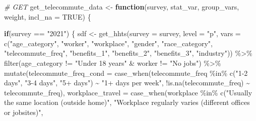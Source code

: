 \documentclass[
  12pt,
]{article}
\newenvironment{Shaded}{\begin{snugshade}}{\end{snugshade}}
\newcommand{\AttributeTok}[1]{\textcolor[rgb]{0.77,0.63,0.00}{#1}}
\newcommand{\CommentTok}[1]{\textcolor[rgb]{0.56,0.35,0.01}{\textit{#1}}}
\newcommand{\ConstantTok}[1]{\textcolor[rgb]{0.00,0.00,0.00}{#1}}
\newcommand{\ControlFlowTok}[1]{\textcolor[rgb]{0.13,0.29,0.53}{\textbf{#1}}}
\newcommand{\FunctionTok}[1]{\textcolor[rgb]{0.00,0.00,0.00}{#1}}
\newcommand{\NormalTok}[1]{#1}
\newcommand{\OtherTok}[1]{\textcolor[rgb]{0.56,0.35,0.01}{#1}}
\newcommand{\SpecialCharTok}[1]{\textcolor[rgb]{0.00,0.00,0.00}{#1}}
\newcommand{\StringTok}[1]{\textcolor[rgb]{0.31,0.60,0.02}{#1}}
\begin{document}
\begin{Shaded}
\begin{Highlighting}[]
\CommentTok{\# GET}
\NormalTok{get\_telecommute\_data }\OtherTok{\textless{}{-}} \ControlFlowTok{function}\NormalTok{(survey, stat\_var, group\_vars, weight, }\AttributeTok{incl\_na =} \ConstantTok{TRUE}\NormalTok{) \{}
  
  \ControlFlowTok{if}\NormalTok{(survey }\SpecialCharTok{==} \StringTok{"2021"}\NormalTok{) \{}
\NormalTok{    sdf }\OtherTok{\textless{}{-}} \FunctionTok{get\_hhts}\NormalTok{(}\AttributeTok{survey =}\NormalTok{ survey,}
                    \AttributeTok{level =} \StringTok{"p"}\NormalTok{,}
                    \AttributeTok{vars =} \FunctionTok{c}\NormalTok{(}\StringTok{"age\_category"}\NormalTok{,}
                             \StringTok{"worker"}\NormalTok{,}
                             \StringTok{"workplace"}\NormalTok{,}
                             \StringTok{"gender"}\NormalTok{,}
                             \StringTok{"race\_category"}\NormalTok{,}
                             \StringTok{"telecommute\_freq"}\NormalTok{,}
                             \StringTok{"benefits\_1"}\NormalTok{,}
                             \StringTok{"benefits\_2"}\NormalTok{,}
                             \StringTok{"benefits\_3"}\NormalTok{,}
                             \StringTok{"industry"}\NormalTok{)) }\SpecialCharTok{\%\textgreater{}\%} 
      \FunctionTok{filter}\NormalTok{(age\_category }\SpecialCharTok{!=} \StringTok{"Under 18 years"}
             \SpecialCharTok{\&}\NormalTok{ worker }\SpecialCharTok{!=} \StringTok{"No jobs"}\NormalTok{) }\SpecialCharTok{\%\textgreater{}\%} 
      \FunctionTok{mutate}\NormalTok{(}\AttributeTok{telecommute\_freq\_cond =} \FunctionTok{case\_when}\NormalTok{(telecommute\_freq }\SpecialCharTok{\%in\%} \FunctionTok{c}\NormalTok{(}\StringTok{"1{-}2 days"}\NormalTok{, }\StringTok{"3{-}4 days"}\NormalTok{, }\StringTok{"5+ days"}\NormalTok{)}
                                                 \SpecialCharTok{\textasciitilde{}} \StringTok{"1+ days per week"}\NormalTok{,}
                                               \SpecialCharTok{!}\FunctionTok{is.na}\NormalTok{(telecommute\_freq) }\SpecialCharTok{\textasciitilde{}}\NormalTok{ telecommute\_freq),}
             \AttributeTok{workplace\_travel =} \FunctionTok{case\_when}\NormalTok{(workplace }\SpecialCharTok{\%in\%} \FunctionTok{c}\NormalTok{(}\StringTok{"Usually the same location (outside home)"}\NormalTok{,}
                                                           \StringTok{"Workplace regularly varies (different offices or jobsites)"}\NormalTok{,}

\end{Highlighting}
\end{Shaded}
\end{document}
